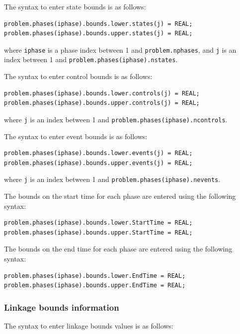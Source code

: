 \documentclass[a4paper,11pt]{report}    %
\begin{document}
The syntax to enter state bounds is as follows:

\begin{verbatim}
problem.phases(iphase).bounds.lower.states(j) = REAL;
problem.phases(iphase).bounds.upper.states(j) = REAL;
\end{verbatim}

\noindent where \texttt{iphase} is a phase index between 1 and \texttt{problem.nphases}, and \texttt{j} is an index
between 1 and \texttt{problem.phases(iphase).nstates}.

The syntax to enter control bounds is as follows:

\begin{verbatim}
problem.phases(iphase).bounds.lower.controls(j) = REAL;
problem.phases(iphase).bounds.upper.controls(j) = REAL;
\end{verbatim}

\noindent where  \texttt{j} is an index
between 1 and \texttt{problem.phases(iphase).ncontrols}.


The syntax to enter event bounds is as follows:

\begin{verbatim}
problem.phases(iphase).bounds.lower.events(j) = REAL;
problem.phases(iphase).bounds.upper.events(j) = REAL;
\end{verbatim}

\noindent where \texttt{j} is an index
between 1 and \texttt{problem.phases(iphase).nevents}.

The bounds on the start time for each phase are entered using the following syntax:

\begin{verbatim}
problem.phases(iphase).bounds.lower.StartTime = REAL;
problem.phases(iphase).bounds.upper.StartTime = REAL;
\end{verbatim}

The bounds on the end time for each phase are entered using the following syntax:

\begin{verbatim}
problem.phases(iphase).bounds.lower.EndTime = REAL;
problem.phases(iphase).bounds.upper.EndTime = REAL;
\end{verbatim}

\subsubsection{Linkage bounds information}

The syntax to enter linkage bounds values is as follows:
\end{document}
